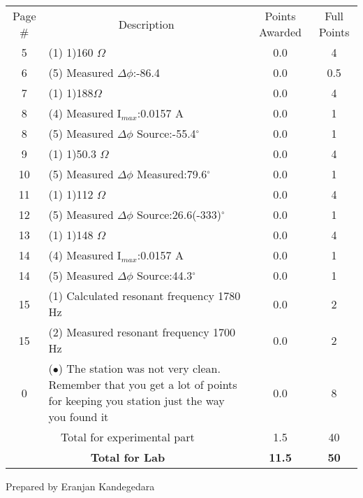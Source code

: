 \documentclass{article}
\begin{document}
\begin{table}[h!] \centering \label{my-label} \begin{tabular}{|c|p{11.75 cm}|c|c|}\hline
\multirow{2}{1cm}{Page \#}& \multicolumn{1}{|c|}{\multirow{2}{*}{Description}}  & \multirow{2}{1.5 cm}{Points Awarded} & \multirow{2}{1 cm}{Full Points} \\   &  &  &\\\hline
5&(1) 1)160 $\Omega$&0.0&4\\\hline
6&(5) Measured $\Delta\phi$:-86.4&0.0&0.5\\\hline
7&(1) 1)188$\Omega$&0.0&4\\\hline
8&(4) Measured I$_{max}$:0.0157 A&0.0&1\\\hline
8&(5) Measured $\Delta\phi$ Source:-55.4$^{\circ}$&0.0&1\\\hline
9&(1) 1)50.3 $\Omega$&0.0&4\\\hline
10&(5) Measured $\Delta\phi$ Measured:79.6$^{\circ}$&0.0&1\\\hline
11&(1) 1)112 $\Omega$&0.0&4\\\hline
12&(5) Measured $\Delta\phi$ Source:26.6(-333)$^{\circ}$&0.0&1\\\hline
13&(1) 1)148 $\Omega$&0.0&4\\\hline
14&(4) Measured I$_{max}$:0.0157 A&0.0&1\\\hline
14&(5) Measured $\Delta\phi$ Source:44.3$^{\circ}$&0.0&1\\\hline
15&(1) Calculated resonant frequency 1780 Hz&0.0&2\\\hline
15&(2) Measured resonant frequency 1700 Hz&0.0&2\\\hline
0&($\bullet$) The station was not very clean. Remember that you get a lot of points for keeping you station just the way you found it&0.0&8\\\hline
\multicolumn{2}{|c|}{\multirow{1}{*}{Total for experimental part}} &1.5& 40 \\\hline\multicolumn{2}{|c|}{\multirow{2}{*}{\textbf{Total for Lab}}} &\multirow{2}{*}{\textbf{11.5}}& \multirow{2}{*}{\textbf{50}} \\ \multicolumn{2}{|c|}{}&&\\ \hline\hline\end{tabular}
 \end{table}
\clearpage
\null\vfill \begin{center}Prepared by Eranjan Kandegedara\end{center}  \clearpage


\end{document}
